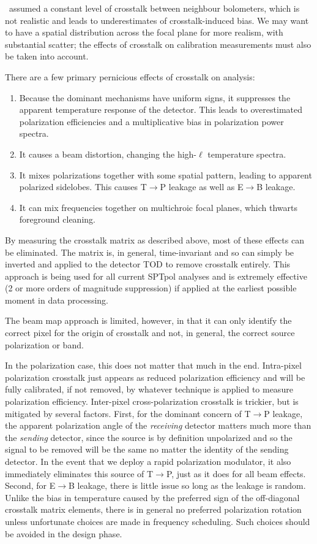\pb\ assumed a constant level of crosstalk between neighbour bolometers, which is not realistic and leads to underestimates of crosstalk-induced bias.
We may want to have a spatial distribution across the focal plane for more realism, with substantial scatter; the effects of crosstalk on calibration measurements must also be taken into account.

There are a few primary pernicious effects of crosstalk on analysis:
\begin{enumerate}
\item{Because the dominant mechanisms have uniform signs, it suppresses the apparent temperature response of the detector. This leads to overestimated polarization efficiencies and a multiplicative bias in polarization power spectra.}
\item{It causes a beam distortion, changing the high-$\ell$ temperature spectra.}
\item{It mixes polarizations together with some spatial pattern, leading to apparent polarized sidelobes. This causes T$\rightarrow$P leakage as well as E$\rightarrow$B leakage.}
\item{It can mix frequencies together on multichroic focal planes, which thwarts foreground cleaning.}
\end{enumerate}

By measuring the crosstalk matrix as described above, most of these effects can be eliminated.
The matrix is, in general, time-invariant and so can simply be inverted and applied to the detector TOD to remove crosstalk entirely.
This approach is being used for all current SPTpol analyses and is extremely effective (2 or more orders of magnitude suppression) if applied at the earliest possible moment in data processing.

The beam map approach is limited, however, in that it can only identify the correct pixel for the origin of crosstalk and not, in general, the correct source polarization or band.

In the polarization case, this does not matter that much in the end.
Intra-pixel polarization crosstalk just appears as reduced polarization efficiency and will be fully calibrated, if not removed, by whatever technique is applied to measure polarization efficiency.
Inter-pixel cross-polarization crosstalk is trickier, but is mitigated by several factors.
First, for the dominant concern of T$\rightarrow$P leakage, the apparent polarization angle of the \emph{receiving} detector matters much more than the \emph{sending} detector, since the source is by definition unpolarized and so the signal to be removed will be the same no matter the identity of the sending detector.
In the event that we deploy a rapid polarization modulator, it also immediately eliminates this source of T$\rightarrow$P, just as it does for all beam effects.
Second, for E$\rightarrow$B leakage, there is little issue so long as the leakage is random.
Unlike the bias in temperature caused by the preferred sign of the off-diagonal crosstalk matrix elements, there is in general no preferred polarization rotation unless unfortunate choices are made in frequency scheduling.
Such choices should be avoided in the design phase.

